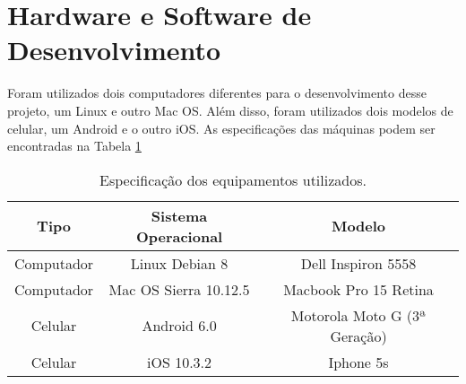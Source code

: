\section{Hardware e Software de Desenvolvimento}

Foram utilizados dois computadores diferentes para o desenvolvimento desse projeto, um Linux e outro Mac OS. Além disso, foram utilizados dois modelos de celular, um Android e o outro iOS. As especificações das máquinas podem ser encontradas na Tabela \ref{tab-hardware}

\begin{table}[h]
    \centering
    \caption{Especificação dos equipamentos utilizados.}
    \label{tab-hardware}
    \begin{tabular}{|c|c|c|}\hline
        \textbf{Tipo} & \textbf{Sistema Operacional} & \textbf{Modelo}              \\ \hline
        Computador    & Linux Debian 8               & Dell Inspiron 5558           \\ \hline
        Computador    & Mac OS Sierra 10.12.5         & Macbook Pro 15 Retina        \\ \hline
        Celular       & Android 6.0                  & Motorola Moto G (3ª Geração) \\ \hline
        Celular       & iOS 10.3.2                   & Iphone 5s                    \\ \hline
    \end{tabular}
\end{table}
